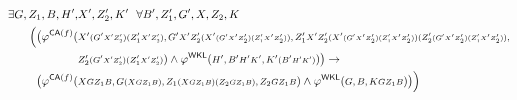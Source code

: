 \begin{align*}
\exists G,Z_1,B,H',&X',Z_2',K'\ \ \forall B',Z_1',G',X,Z_2,K\\
\Big(
 \big(
  \phi^{\CA(f)}(&\args{
    X'\args{(G'\args{X'Z_2'})(Z_1'\args{X'Z_2'})},
    G'\args{X'Z_2'(X'\args{(G'\args{X'Z_2'})(Z_1'\args{X'Z_2'})})},
    Z_1'\args{X'Z_2'(X'\args{(G'\args{X'Z_2'})(Z_1'\args{X'Z_2'})})
   (Z_2'\args{(G'\args{X'Z_2'})(Z_1'\args{X'Z_2'})})},}\\
    &\args{Z_2'\args{(G'\args{X'Z_2'})(Z_1'\args{X'Z_2'})}
  })\wedge
  \phi^{\WKL}(\args{
     H', B'\args{H'K'}, K'\args{(B'\args{H'K'})}
  })
 \big)\rightarrow\\
 \big(
  \phi^{\CA(f)}(&\args{
     X\args{GZ_1B},
     G\args{(X\args{GZ_1B})},
     Z_1\args{(X\args{GZ_1B})(Z_2\args{GZ_1B})},
     Z_2\args{GZ_1B}
  })\wedge
  \phi^{\WKL}(\args{
     G,
     B,
     K\args{GZ_1B}  
  })
 \big)
\Big)
\end{align*}

